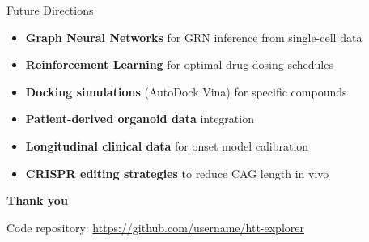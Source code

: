 \documentclass[aspectratio=169,11pt]{beamer}
\begin{document}
\begin{frame}{Future Directions}
    \begin{itemize}
        \item \textbf{Graph Neural Networks} for GRN inference from single-cell data
        \item \textbf{Reinforcement Learning} for optimal drug dosing schedules
        \item \textbf{Docking simulations} (AutoDock Vina) for specific compounds
        \item \textbf{Patient-derived organoid data} integration
        \item \textbf{Longitudinal clinical data} for onset model calibration
        \item \textbf{CRISPR editing strategies} to reduce CAG length in vivo
    \end{itemize}

    \vspace{0.8cm}
    \begin{center}
        \Large\textbf{Thank you}

        \vspace{0.3cm}
        \normalsize
        Code repository: \url{https://github.com/username/htt-explorer}
    \end{center}
\end{frame}
\end{document}
